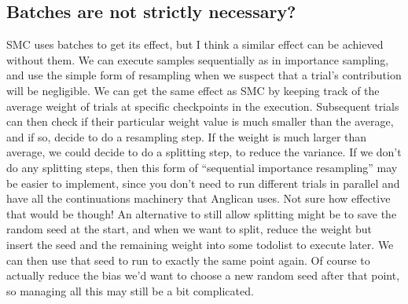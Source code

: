 \documentclass[a4paper, 11pt]{article}
\theoremstyle{definition}
\begin{document}
\subsection*{Batches are not strictly necessary?}

SMC uses batches to get its effect, but I think a similar effect can be achieved without them. We can execute samples sequentially as in importance sampling, and use the simple form of resampling when we suspect that a trial's contribution will be negligible. We can get the same effect as SMC by keeping track of the average weight of trials at specific checkpoints in the execution. Subsequent trials can then check if their particular weight value is much smaller than the average, and if so, decide to do a resampling step. If the weight is much larger than average, we could decide to do a splitting step, to reduce the variance. If we don't do any splitting steps, then this form of ``sequential importance resampling'' may be easier to implement, since you don't need to run different trials in parallel and have all the continuations machinery that Anglican uses. Not sure how effective that would be though! An alternative to still allow splitting might be to save the random seed at the start, and when we want to split, reduce the weight but insert the seed and the remaining weight into some todolist to execute later. We can then use that seed to run to exactly the same point again. Of course to actually reduce the bias we'd want to choose a new random seed after that point, so managing all this may still be a bit complicated.



\end{document}
